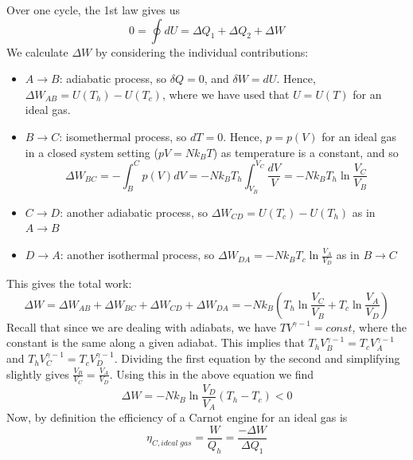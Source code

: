 \documentclass[12pt, a4paper, oneside, openright, titlepage]{book}
\begin{document}
\begin{eg}
\begin{center}
    \end{center}
    Over one cycle, the 1st law gives us \begin{equation*}
        0 = \oint dU = \Delta Q_1 + \Delta Q_2 + \Delta W
    \end{equation*}
    We calculate $\Delta W$ by considering the individual contributions: \begin{itemize}
        \item $A\rightarrow B$: adiabatic process, so $\delta Q = 0$, and $\delta W = dU$. Hence, $\Delta W_{AB} = U(T_h) - U(T_c)$, where we have used that $U = U(T)$ for an ideal gas.
        \item $B\rightarrow C$: isomethermal process, so $dT = 0$. Hence, $p = p(V)$ for an ideal gas in a closed system setting ($pV = Nk_BT$) as temperature is a constant, and so $$\Delta W_{BC} = -\int_B^Cp(V)dV = -Nk_BT_h\int_{V_B}^{V_C}\frac{dV}{V} = -Nk_BT_h\ln\frac{V_C}{V_B}$$
        \item $C\rightarrow D$: another adiabatic process, so $\Delta W_{CD} = U(T_c) - U(T_h)$ as in $A\rightarrow B$
        \item $D\rightarrow A$: another isothermal process, so $\Delta W_{DA} = -Nk_BT_c\ln\frac{V_A}{V_D}$ as in $B\rightarrow C$
    \end{itemize}
    This gives the total work: \begin{equation*}
        \Delta W = \Delta W_{AB} + \Delta W_{BC} + \Delta W_{CD} + \Delta W_{DA} = -Nk_B\left(T_h\ln\frac{V_C}{V_B} +T_c\ln\frac{V_A}{V_D}\right)
    \end{equation*}
    Recall that since we are dealing with adiabats, we have $TV^{\gamma -1} = const$, where the constant is the same along a given adiabat. This implies that $T_hV_B^{\gamma - 1} = T_cV_A^{\gamma -1}$ and $T_hV_C^{\gamma - 1} = T_cV_D^{\gamma - 1}$. Dividing the first equation by the second and simplifying slightly gives $\frac{V_B}{V_C} = \frac{V_A}{V_D}$. Using this in the above equation we find \begin{equation*}
        \Delta W = -Nk_B\ln\frac{V_D}{V_A}(T_h - T_c) < 0
    \end{equation*}
    Now, by definition the efficiency of a Carnot engine for an ideal gas is \begin{equation*}
        \eta_{C,ideal\;gas} = \frac{W}{Q_h} = \frac{-\Delta W}{\Delta Q_1}

\end{equation*}
\end{eg}
\end{document}
